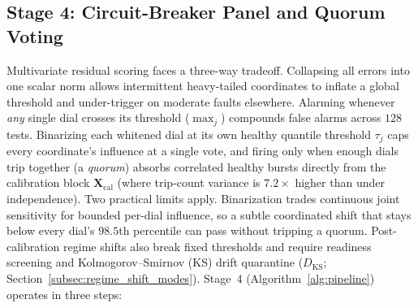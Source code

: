\documentclass[journal]{IEEEtran}
\begin{document}
\subsection{Stage 4: Circuit-Breaker Panel and Quorum Voting}
\label{subsec:scoring_function}
\label{subsubsec:circuit_breaker_panel}
\label{subsubsec:causal_saliency_gating}
Multivariate residual scoring faces a three-way tradeoff. Collapsing all errors into one scalar norm allows intermittent heavy-tailed coordinates to inflate a global threshold and under-trigger on moderate faults elsewhere. Alarming whenever \emph{any} single dial crosses its threshold ($\max_j$) compounds false alarms across $128$ tests. Binarizing each whitened dial at its own healthy quantile threshold $\tau_j$ caps every coordinate's influence at a single vote, and firing only when enough dials trip together (a \emph{quorum}) absorbs correlated healthy bursts directly from the calibration block $\mathbf{X}_{\text{cal}}$ (where trip-count variance is $7.2\times$ higher than under independence). Two practical limits apply. Binarization trades continuous joint sensitivity for bounded per-dial influence, so a subtle coordinated shift that stays below every dial's $98.5$th percentile can pass without tripping a quorum. Post-calibration regime shifts also break fixed thresholds and require readiness screening and Kolmogorov--Smirnov (KS) drift quarantine ($D_{\text{KS}}$; Section~\ref{subsec:regime_shift_modes}). Stage~4 (Algorithm~\ref{alg:pipeline}) operates in three steps:
\end{document}
